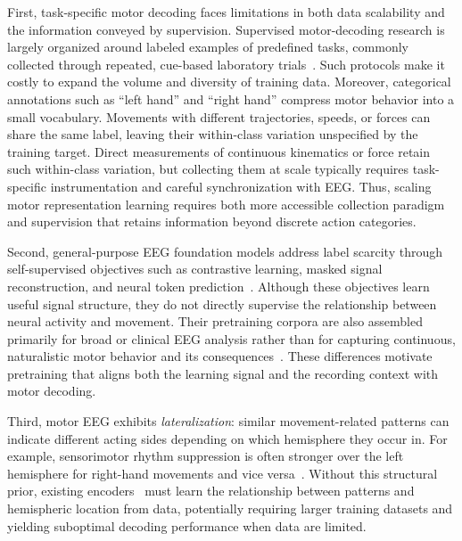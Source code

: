 First, task-specific motor decoding faces limitations in both data scalability and the information conveyed by supervision. Supervised motor-decoding research is largely organized around labeled examples of predefined tasks, commonly collected through repeated, cue-based laboratory trials~\citep{tangermann2012review,schirrmeister2017deep,lawhern2018eegnet}. Such protocols make it costly to expand the volume and diversity of training data. Moreover, categorical annotations such as ``left hand'' and ``right hand'' compress motor behavior into a small vocabulary. Movements with different trajectories, speeds, or forces can share the same label, leaving their within-class variation unspecified by the training target. Direct measurements of continuous kinematics or force retain such within-class variation, but collecting them at scale typically requires task-specific instrumentation and careful synchronization with EEG. Thus, scaling motor representation learning requires both more accessible collection paradigm and supervision that retains information beyond discrete action categories.

Second, general-purpose EEG foundation models address label scarcity through self-supervised objectives such as contrastive learning, masked signal reconstruction, and neural token prediction~\citep{kostas2021bendr,chien2022maeeg,jiang2024large,wang2024eegpt,wang2025cbramod}. Although these objectives learn useful signal structure, they do not directly supervise the relationship between neural activity and movement. Their pretraining corpora are also assembled primarily for broad or clinical EEG analysis rather than for capturing continuous, naturalistic motor behavior and its consequences~\citep{jiang2024large,wang2025cbramod,obeid2016tuh,ouahidi2025reve}. These differences motivate pretraining that aligns both the learning signal and the recording context with motor decoding.

Third, motor EEG exhibits \emph{lateralization}: similar movement-related patterns can indicate different acting sides depending on which hemisphere they occur in. For example, sensorimotor rhythm suppression is often stronger over the left hemisphere for right-hand movements and vice versa~\citep{pfurtscheller1997motor,nam2011lateralization}. Without this structural prior, existing encoders~\citep{schirrmeister2017deep,lawhern2018eegnet,wang2025cbramod} must learn the relationship between patterns and hemispheric location from data, potentially requiring larger training datasets and yielding suboptimal decoding performance when data are limited.

